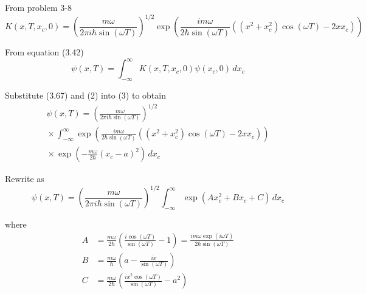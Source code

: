 


From problem 3-8
\begin{equation*}
K(x,T,x_c,0)=
\left(\frac{m\omega}{2\pi i\hbar\sin(\omega T)}\right)^{1/2}
\exp\left(
\frac{im\omega}{2\hbar\sin(\omega T)}\left((x^2+x_c^2)\cos(\omega T)-2xx_c\right)
\right)
\tag{2}
\end{equation*}

From equation (3.42)
\begin{equation*}
\psi(x,T)=\int_{-\infty}^\infty K(x,T,x_c,0)\psi(x_c,0)\,dx_c
\tag{3}
\end{equation*}

Substitute (3.67) and (2) into (3) to obtain
\begin{multline*}
\psi(x,T)=\left(\frac{m\omega}{2\pi i\hbar\sin(\omega T)}\right)^{1/2}
\\
{}\times
\int_{-\infty}^\infty
\exp\left(
\frac{im\omega}{2\hbar\sin(\omega T)}\left((x^2+x_c^2)\cos(\omega T)-2xx_c\right)
\right)
\\
{}\times
\exp\left(-\frac{m\omega}{2\hbar}(x_c-a)^2\right)\,dx_c
\end{multline*}

Rewrite as
\begin{equation*}
\psi(x,T)=\left(\frac{m\omega}{2\pi i\hbar\sin(\omega T)}\right)^{1/2}
\int_{-\infty}^\infty\exp(Ax_c^2+Bx_c+C)\,dx_c
\tag{4}
\end{equation*}

where
\begin{align*}
A&=\frac{m\omega}{2\hbar}\left(\frac{i\cos(\omega T)}{\sin(\omega T)}-1\right)
=\frac{im\omega\exp(i\omega T)}{2\hbar\sin(\omega T)}
\\
B&=\frac{m\omega}{\hbar}\left(a-\frac{ix}{\sin(\omega T)}\right)
\\
C&=\frac{m\omega}{2\hbar}\left(\frac{ix^2\cos(\omega T)}{\sin(\omega T)}-a^2\right)
\end{align*}


